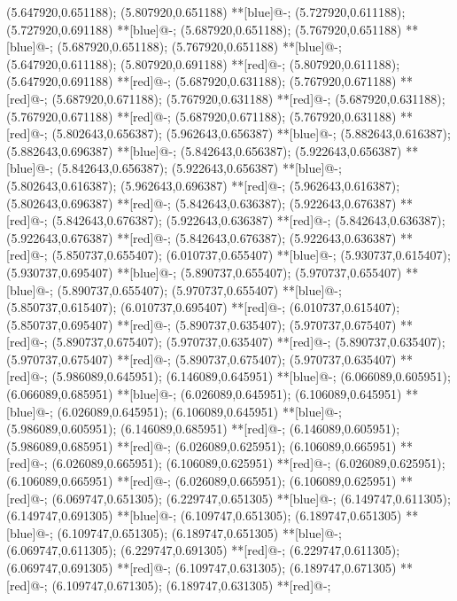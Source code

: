 (5.647920,0.651188); (5.807920,0.651188) **[blue]@{-};
(5.727920,0.611188); (5.727920,0.691188) **[blue]@{-};
(5.687920,0.651188); (5.767920,0.651188) **[blue]@{-};
(5.687920,0.651188); (5.767920,0.651188) **[blue]@{-};
(5.647920,0.611188); (5.807920,0.691188) **[red]@{-};
(5.807920,0.611188); (5.647920,0.691188) **[red]@{-};
(5.687920,0.631188); (5.767920,0.671188) **[red]@{-};
(5.687920,0.671188); (5.767920,0.631188) **[red]@{-};
(5.687920,0.631188); (5.767920,0.671188) **[red]@{-};
(5.687920,0.671188); (5.767920,0.631188) **[red]@{-};
(5.802643,0.656387); (5.962643,0.656387) **[blue]@{-};
(5.882643,0.616387); (5.882643,0.696387) **[blue]@{-};
(5.842643,0.656387); (5.922643,0.656387) **[blue]@{-};
(5.842643,0.656387); (5.922643,0.656387) **[blue]@{-};
(5.802643,0.616387); (5.962643,0.696387) **[red]@{-};
(5.962643,0.616387); (5.802643,0.696387) **[red]@{-};
(5.842643,0.636387); (5.922643,0.676387) **[red]@{-};
(5.842643,0.676387); (5.922643,0.636387) **[red]@{-};
(5.842643,0.636387); (5.922643,0.676387) **[red]@{-};
(5.842643,0.676387); (5.922643,0.636387) **[red]@{-};
(5.850737,0.655407); (6.010737,0.655407) **[blue]@{-};
(5.930737,0.615407); (5.930737,0.695407) **[blue]@{-};
(5.890737,0.655407); (5.970737,0.655407) **[blue]@{-};
(5.890737,0.655407); (5.970737,0.655407) **[blue]@{-};
(5.850737,0.615407); (6.010737,0.695407) **[red]@{-};
(6.010737,0.615407); (5.850737,0.695407) **[red]@{-};
(5.890737,0.635407); (5.970737,0.675407) **[red]@{-};
(5.890737,0.675407); (5.970737,0.635407) **[red]@{-};
(5.890737,0.635407); (5.970737,0.675407) **[red]@{-};
(5.890737,0.675407); (5.970737,0.635407) **[red]@{-};
(5.986089,0.645951); (6.146089,0.645951) **[blue]@{-};
(6.066089,0.605951); (6.066089,0.685951) **[blue]@{-};
(6.026089,0.645951); (6.106089,0.645951) **[blue]@{-};
(6.026089,0.645951); (6.106089,0.645951) **[blue]@{-};
(5.986089,0.605951); (6.146089,0.685951) **[red]@{-};
(6.146089,0.605951); (5.986089,0.685951) **[red]@{-};
(6.026089,0.625951); (6.106089,0.665951) **[red]@{-};
(6.026089,0.665951); (6.106089,0.625951) **[red]@{-};
(6.026089,0.625951); (6.106089,0.665951) **[red]@{-};
(6.026089,0.665951); (6.106089,0.625951) **[red]@{-};
(6.069747,0.651305); (6.229747,0.651305) **[blue]@{-};
(6.149747,0.611305); (6.149747,0.691305) **[blue]@{-};
(6.109747,0.651305); (6.189747,0.651305) **[blue]@{-};
(6.109747,0.651305); (6.189747,0.651305) **[blue]@{-};
(6.069747,0.611305); (6.229747,0.691305) **[red]@{-};
(6.229747,0.611305); (6.069747,0.691305) **[red]@{-};
(6.109747,0.631305); (6.189747,0.671305) **[red]@{-};
(6.109747,0.671305); (6.189747,0.631305) **[red]@{-};
